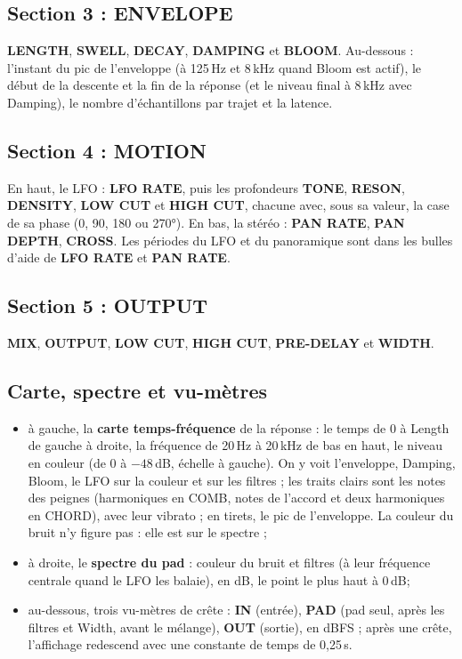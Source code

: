 \documentclass[a4paper,11pt]{article}
\newcommand{\ctl}[1]{\textsf{\textbf{#1}}}   %
\newcommand{\dB}{\,dB}
\begin{document}
\subsection{Section 3 : ENVELOPE}
\ctl{LENGTH}, \ctl{SWELL}, \ctl{DECAY}, \ctl{DAMPING} et \ctl{BLOOM}. Au-dessous : l'instant du pic
de l'enveloppe (à 125\,Hz et 8\,kHz quand Bloom est actif), le début de la descente et la fin de la réponse (et le
niveau final à 8\,kHz avec Damping), le nombre d'échantillons par trajet et la latence.

\subsection{Section 4 : MOTION}
En haut, le LFO : \ctl{LFO RATE}, puis les profondeurs \ctl{TONE}, \ctl{RESON},
\ctl{DENSITY}, \ctl{LOW CUT} et \ctl{HIGH CUT}, chacune avec, sous sa valeur, la case de sa
phase (0, 90, 180 ou 270°). En bas, la stéréo : \ctl{PAN RATE}, \ctl{PAN DEPTH}, \ctl{CROSS}.
Les périodes du LFO et du panoramique sont dans les bulles d'aide de \ctl{LFO RATE} et
\ctl{PAN RATE}.

\subsection{Section 5 : OUTPUT}
\ctl{MIX}, \ctl{OUTPUT}, \ctl{LOW CUT}, \ctl{HIGH CUT}, \ctl{PRE-DELAY} et \ctl{WIDTH}.

\subsection{Carte, spectre et vu-mètres}
\begin{itemize}
\item à gauche, la \textbf{carte temps-fréquence} de la réponse : le temps de 0 à Length de gauche
  à droite, la fréquence de 20\,Hz à 20\,kHz de bas en haut, le niveau en couleur (de 0 à
  $-48$\dB, échelle à gauche). On y voit l'enveloppe, Damping, Bloom, le LFO sur la couleur et sur les
  filtres ; les traits clairs sont les notes des peignes (harmoniques en COMB, notes de l'accord et
  deux harmoniques en CHORD), avec leur vibrato ; en tirets, le pic de l'enveloppe. La couleur du
  bruit n'y figure pas : elle est sur le spectre ;
\item à droite, le \textbf{spectre du pad} : couleur du bruit et filtres (à leur fréquence
  centrale quand le LFO les balaie), en dB, le point le plus haut à 0\dB ;
\item au-dessous, trois vu-mètres de crête : \ctl{IN} (entrée), \ctl{PAD} (pad seul, après les
  filtres et Width, avant le mélange), \ctl{OUT} (sortie), en dBFS ; après une crête, l'affichage
  redescend avec une constante de temps de 0,25\,s.
\end{itemize}
\end{document}
